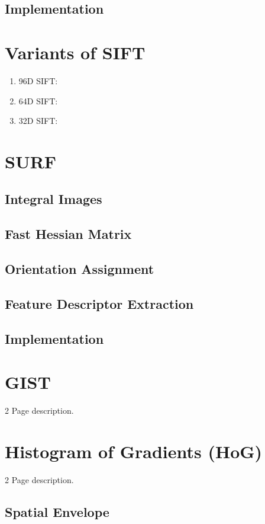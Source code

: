 \subsection {Implementation}
\section{Variants of SIFT}

\begin{enumerate}
\item 96D SIFT:
\item 64D SIFT: 
\item 32D SIFT: 
\end {enumerate}

\section{SURF}
\subsection{Integral Images}
\subsection{Fast Hessian Matrix}
\subsection{Orientation Assignment}
\subsection{Feature Descriptor Extraction}
\subsection{Implementation}

\section{GIST}
2 Page description. 

\section{Histogram of Gradients (HoG)}
2 Page description. 
\subsection{Spatial Envelope}

